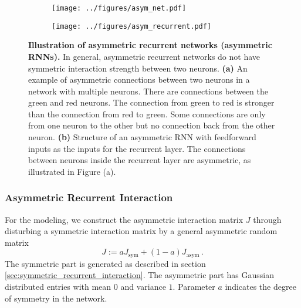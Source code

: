 \documentclass[11pt]{article}
\begin{document}
	\begin{figure}[H] 
		\begin{subfigure}[b]{0.4\textwidth}
			\centering
			\texttt{[image: ../figures/asym\_net.pdf]}
			\vspace{0.2cm}
			\caption{}
		\end{subfigure}
		\hspace{0.4cm}
		\begin{subfigure}[b]{0.4\textwidth}
			\centering
			\texttt{[image: ../figures/asym\_recurrent.pdf]}
			\caption{}
		\end{subfigure}
		\caption[Illustration of asymmetric recurrent networks (asymmetric RNNs)]{\textbf{Illustration of asymmetric recurrent networks (asymmetric RNNs).} In general, asymmetric recurrent networks do not have symmetric interaction strength between two neurons. \textbf{(a)} An example of asymmetric connections between two neurons in a network with multiple neurons. There are connections between the green and red neurons. The connection from green to red is stronger than the connection from red to green. Some connections are only from one neuron to the other but no connection back from the other neuron.  \textbf{(b)} Structure of an asymmetric RNN with feedforward inputs as the inputs for the recurrent layer. The connections between neurons inside the recurrent layer are asymmetric, as illustrated in Figure (a).}
		\label{fig:asymmetric_RNN}
	\end{figure}
	
	 
	\subsubsection{Asymmetric Recurrent Interaction} \label{sec:asym_recurrent_network}
	For the modeling, we construct the asymmetric interaction matrix $J$ through disturbing a symmetric interaction matrix by a general asymmetric random matrix
		\begin{equation} \label{eq:asym_interaction_matrix}
			J := a J_{\text{sym}} + (1-a) J_{\text{asym}} \, .
		\end{equation}
	The symmetric part is generated as described in section \ref{sec:symmetric_recurrent_interaction}. The asymmetric part has Gaussian distributed entries with mean $0$ and variance $1$. Parameter $a$ indicates the degree of symmetry in the network. 
	
\end{document}
